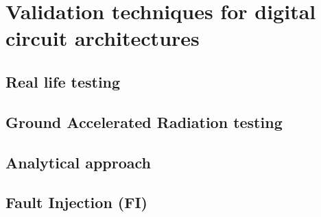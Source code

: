 {{{		}
	
	}
	\section{Validation techniques for digital circuit architectures}{
		
		\subsection{Real life testing}{
			
		}
		\subsection{Ground Accelerated Radiation testing}{
			
		}
		\subsection{Analytical approach}{
			
		}
		\subsection{Fault Injection (FI)}{
			
		}
	}
}